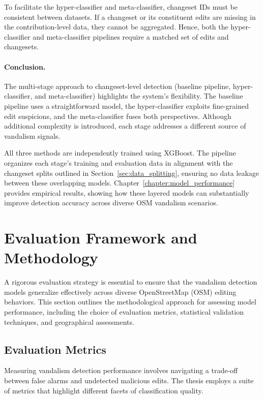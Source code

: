 \documentclass[
    13pt, %
    a4paper, %
    listof=totoc, %
    bibliography=totoc, %
    index=totoc, %
    headsepline
]{scrreprt}
\begin{document}
To facilitate the hyper-classifier and meta-classifier, changeset IDs must be consistent between datasets. If a changeset or its constituent edits are missing in the contribution-level data, they cannot be aggregated. Hence, both the hyper-classifier and meta-classifier pipelines require a matched set of edits and changesets.

\paragraph{Conclusion.}

The multi-stage approach to changeset-level detection (baseline pipeline, hyper-classifier, and meta-classifier) highlights the system’s flexibility. The baseline pipeline uses a straightforward model, the hyper-classifier exploits fine-grained edit suspicions, and the meta-classifier fuses both perspectives. Although additional complexity is introduced, each stage addresses a different source of vandalism signals.

All three methods are independently trained using XGBoost. The pipeline organizes each stage’s training and evaluation data in alignment with the changeset splits outlined in Section~\ref{sec:data_splitting}, ensuring no data leakage between these overlapping models. Chapter~\ref{chapter:model_performance} provides empirical results, showing how these layered models can substantially improve detection accuracy across diverse OSM vandalism scenarios.

\section{Evaluation Framework and Methodology}  
\label{sec:evaluation_framework}

A rigorous evaluation strategy is essential to ensure that the vandalism detection models generalize effectively across diverse OpenStreetMap (OSM) editing behaviors. This section outlines the methodological approach for assessing model performance, including the choice of evaluation metrics, statistical validation techniques, and geographical assessments.

\subsection{Evaluation Metrics}
\label{sec:evaluation_metrics}

Measuring vandalism detection performance involves navigating a trade-off between false alarms and undetected malicious edits. The thesis employs a suite of metrics that highlight different facets of classification quality.
\end{document}
